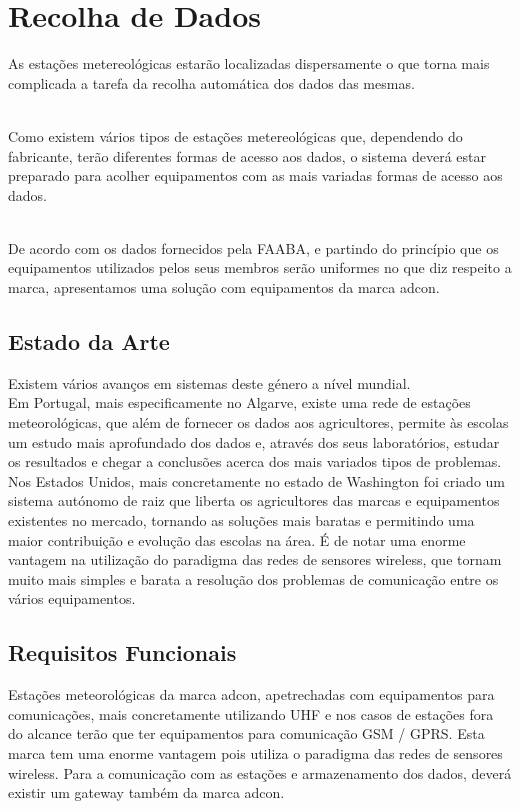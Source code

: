 \chapter{Recolha de Dados}
	As estações metereológicas estarão localizadas dispersamente 
	o que torna mais complicada a tarefa da recolha automática dos dados das mesmas.
	
	\\Como existem vários tipos de estações metereológicas que, dependendo do fabricante, 
	terão diferentes formas de acesso aos dados, o sistema deverá estar preparado para 
	acolher equipamentos com as mais variadas formas de acesso aos dados.

	\\De acordo com os dados fornecidos pela FAABA, e partindo do princípio que 
	os equipamentos utilizados pelos seus membros serão uniformes no que diz respeito 
	a marca, apresentamos uma solução com equipamentos da marca adcon.


\section{Estado da Arte}
Existem vários avanços em sistemas deste género a nível mundial. 
\\Em Portugal, mais especificamente no Algarve, existe uma rede de estações meteorológicas, que além de fornecer os dados aos agricultores, permite às escolas um estudo mais aprofundado dos dados e, através dos seus laboratórios, estudar os resultados e chegar a conclusões acerca dos mais variados tipos de problemas. 
\\Nos Estados Unidos, mais concretamente no estado de Washington foi criado um sistema autónomo de raiz que liberta os agricultores das marcas e equipamentos existentes no mercado, tornando as soluções mais baratas e permitindo uma maior contribuição e evolução das escolas na área. É de notar uma enorme vantagem na utilização do paradigma das redes de sensores wireless, que tornam muito mais simples e barata a resolução dos problemas de comunicação entre os vários equipamentos. 


\section{Requisitos Funcionais}
Estações meteorológicas da marca adcon, apetrechadas com equipamentos para comunicações, mais concretamente utilizando UHF e nos casos de estações fora do alcance terão que ter equipamentos para comunicação GSM / GPRS. Esta marca tem uma enorme vantagem pois utiliza o paradigma das redes de sensores wireless.
Para a comunicação com as estações e armazenamento dos dados, deverá existir um gateway também da marca adcon.

